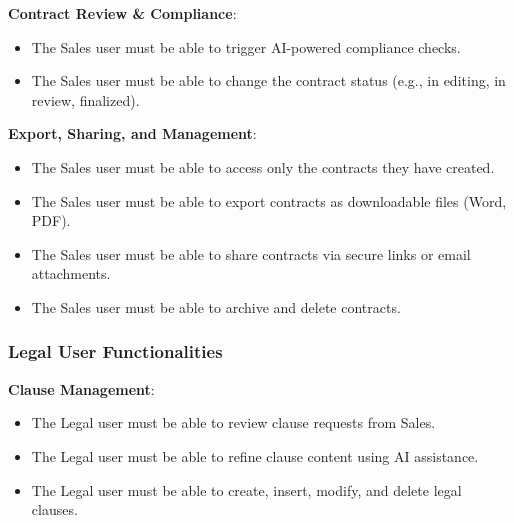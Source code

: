 \textbf{Contract Review \& Compliance}:\vspace{0.4em}
\begin{adjustwidth}{3em}{1em}
    \begin{itemize}
        \item The Sales user must be able to trigger AI-powered compliance checks.\vspace{0.4em}
        \item The Sales user must be able to change the contract status (e.g., in editing, in review, finalized).
    \end{itemize}
\end{adjustwidth}\vspace{0.85em} 

\textbf{Export, Sharing, and Management}:\vspace{0.4em}
\begin{adjustwidth}{3em}{1em}
    \begin{itemize}
        \item The Sales user must be able to access only the contracts they have created.\vspace{0.4em}
        \item The Sales user must be able to export contracts as downloadable files (Word, PDF).\vspace{0.4em}
        \item The Sales user must be able to share contracts via secure links or email attachments.\vspace{0.4em}
        \item The Sales user must be able to archive and delete contracts.
    \end{itemize}
\end{adjustwidth}\vspace{0.85em}  

\subsubsection{Legal User Functionalities}

\textbf{Clause Management}:\vspace{0.4em}
\begin{adjustwidth}{3em}{1em}
    \begin{itemize}
        \item The Legal user must be able to review clause requests from Sales.\vspace{0.4em}
        \item The Legal user must be able to refine clause content using AI assistance.\vspace{0.4em}
        \item The Legal user must be able to create, insert, modify, and delete legal clauses.  
    \end{itemize}
\end{adjustwidth}\vspace{0.85em} 

